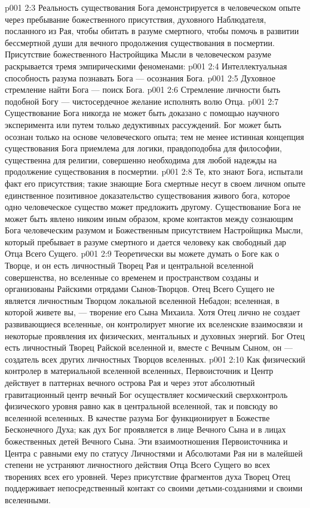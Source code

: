 \vs p001 2:3 \pc Реальность существования Бога демонстрируется в человеческом опыте через пребывание божественного присутствия, духовного Наблюдателя, посланного из Рая, чтобы обитать в разуме смертного, чтобы помочь в развитии бессмертной души для вечного продолжения существования в посмертии. Присутствие божественного Настройщика Мысли в человеческом разуме раскрывается тремя эмпирическими феноменами:
\vs p001 2:4 \bibnobreakspace Интеллектуальная способность разума познавать Бога --- осознания Бога.
\vs p001 2:5 \bibnobreakspace Духовное стремление найти Бога --- поиск Бога.
\vs p001 2:6 \bibnobreakspace Стремление личности быть подобной Богу --- чистосердечное желание исполнять волю Отца.
\vs p001 2:7 \pc Существование Бога никогда не может быть доказано с помощью научного эксперимента или путем только дедуктивных рассуждений. Бог может быть осознан только на основе человеческого опыта; тем не менее истинная концепция существования Бога приемлема для логики, правдоподобна для философии, существенна для религии, совершенно необходима для любой надежды на продолжение существования в посмертии.
\vs p001 2:8 Те, кто знают Бога, испытали факт его присутствия; такие знающие Бога смертные несут в своем личном опыте единственное позитивное доказательство существования живого бога, которое одно человеческое существо может предложить другому. Существование Бога не может быть явлено никоим иным образом, кроме контактов между сознающим Бога человеческим разумом и Божественным присутствием Настройщика Мысли, который пребывает в разуме смертного и дается человеку как свободный дар Отца Всего Сущего.
\vs p001 2:9 \pc Теоретически вы можете думать о Боге как о Творце, и он есть личностный Творец Рая и центральной вселенной совершенства, но вселенные со временем и пространством созданы и организованы Райскими отрядами Сынов\hyp{}Творцов. Отец Всего Сущего не является личностным Творцом локальной вселенной Небадон; вселенная, в которой живете вы, --- творение его Сына Михаила. Хотя Отец лично не создает развивающиеся вселенные, он контролирует многие их вселенские взаимосвязи и некоторые проявления их физических, ментальных и духовных энергий. Бог Отец есть личностный Творец Райской вселенной и, вместе с Вечным Сыном, он --- создатель всех других личностных Творцов вселенных.
\vs p001 2:10 \pc Как физический контролер в материальной вселенной вселенных, Первоисточник и Центр действует в паттернах вечного острова Рая и через этот абсолютный гравитационный центр вечный Бог осуществляет космический сверхконтроль физического уровня равно как в центральной вселенной, так и повсюду во вселенной вселенных. В качестве разума Бог функционирует в Божестве Бесконечного Духа; как дух Бог проявляется в лице Вечного Сына и в лицах божественных детей Вечного Сына. Эти взаимоотношения Первоисточника и Центра с равными ему по статусу Личностями и Абсолютами Рая ни в малейшей степени не устраняют  личностного действия Отца Всего Сущего во всех творениях всех его уровней. Через присутствие фрагментов духа Творец Отец поддерживает непосредственный контакт со своими детьми\hyp{}созданиями и своими вселенными.

